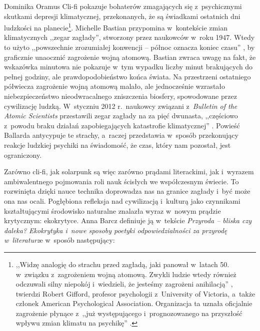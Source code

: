 \begin{artplenv}{Dominika Oramus}
Cli-fi pokazuje bohaterów zmagających się z~psychicznymi skutkami depresji klimatycznej, przekonanych, że są świadkami ostatnich dni ludzkości na planecie\footnote{,,Widzę analogię do strachu przed zagładą, jaki panował w~latach 50. w~związku z~zagrożeniem wojną atomową. Zwykli ludzie wtedy również odczuwali silny niepokój i~wiedzieli, że jesteśmy zagrożeni anihilacją''
\parencite[][]{hamilton_climate_2016}, %
 twierdzi Robert Gifford, profesor psychologii z~University of Victoria, a~także członek American Psychological Association. Organizacja ta uznała oficjalnie zagrożenie płynące z~,,już występującego i~prognozowanego na przyszłość wpływu zmian klimatu na psychikę''
\parencite[][]{hamilton_climate_2016}.
 }. Michelle Bastian przypomina w~kontekście zmian klimatycznych ,,zegar zagłady'', stworzony przez naukowców w~roku 1947. Wtedy to użyto ,,powszechnie zrozumiałej konwencji -- północ oznacza koniec czasu'' 
\parencite[][s.~39]{bastian_fatally_2012}, %
 by graficznie unaocznić zagrożenie wojną atomową. Bastian zwraca uwagę na fakt, że wskazówka minutowa nie pokazuje w~tym wypadku liczby minut brakujących do pełnej godziny, ale prawdopodobieństwo końca świata. Na przestrzeni ostatniego półwiecza zagrożenie wojną atomową malało, ale jednocześnie wzrastało niebezpieczeństwo nieodwracalnego zniszczenia biosfery, spowodowane przez cywilizację ludzką. W~styczniu 2012 r.~naukowcy związani z~\textit{Bulletin of the Atomic Scientists} przestawili zegar zagłady na za pięć dwunasta, ,,częściowo z~powodu braku działań zapobiegających katastrofie klimatycznej'' 
\parencite[][s.~39]{bastian_fatally_2012}. %
 Powieść Ballarda antycypuje te strachy, a~raczej przedstawia w~sposób przekonujący reakcje ludzkiej psychiki na świadomość, że czas, który nam pozostał, jest ograniczony.

Zarówno cli-fi, jak solarpunk są więc zarówno prądami literackimi, jak i~wyrazem ambiwalentnego pojmowania roli nauk ścisłych we współczesnym świecie. To rozwinięta dzięki nauce technika doprowadza nas na granice zagłady i~być może ona nas ocali. Pogłębiona refleksja nad cywilizacją i~kulturą jako czynnikami kształtującymi środowisko naturalne znalazła wyraz w~nowym prądzie krytycznym: ekokrytyce. Anna Barcz definiuje ją w~tekście \textit{Przyroda -- bliska czy daleka? Ekokrytyka i~nowe sposoby poetyki odpowiedzialności za przyrodę w~literaturz}e w~sposób następujący:


\end{artplenv}
